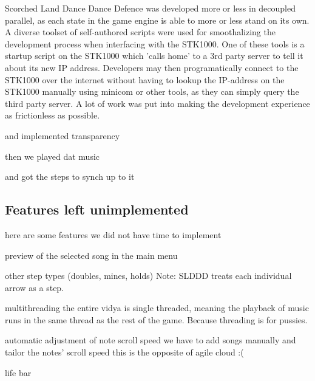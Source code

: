 Scorched Land Dance Dance Defence was developed more or less in decoupled parallel, as each state in the game engine is able to more or less stand on its own.
A diverse toolset of self-authored scripts were used for smoothalizing the development process when interfacing with the STK1000.
One of these tools is a startup script on the STK1000 which 'calls home' to a 3rd party server to tell it about its new IP address.
Developers may then programatically connect to the STK1000 over the internet without having to lookup the IP-address on the STK1000 manually using minicom or other tools, as they can simply query the third party server.
A lot of work was put into making the development experience as frictionless as possible.



and implemented transparency

then we played dat music

and got the steps to synch up to it


\subsection{Features left unimplemented}
	here are some features we did not have time to implement


	preview of the selected song in the main menu

	other step types (doubles, mines, holds)
		Note: SLDDD treats each individual arrow as a step. 

	multithreading
		the entire vidya is single threaded, meaning the playback of music runs in the same thread as the rest of the game. Because threading is for pussies.

	automatic adjustment of note scroll speed
		we have to add songs manually and tailor the notes' scroll speed
		this is the opposite of agile cloud :(

	life bar


